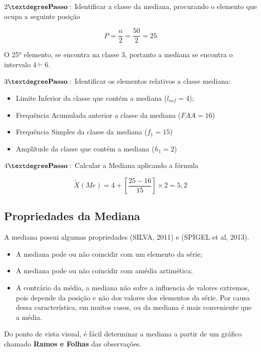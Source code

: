 $2° \mbox{\textbf{Passo}}:$ Identificar a classe da mediana, procurando o elemento que ocupa a seguinte posição

$$ P=\frac{n}{2}=\frac{50}{2}=25 $$

O 25° elemento, se encontra na classe 3, portanto a mediana se encontra o intervalo $ 4 \vdash 6$.

\vskip0.3cm

$3° \mbox{\textbf{Passo}}:$ Identificar os elementos relativos a classe mediana:

\begin{itemize}
  \item Limite Inferior da classe que contém a mediana ($l_{inf}=4$);
  \item Frequência Acumulada anterior a classe da mediana ($FAA=16$)
  \item Frequência Simples da classe da mediana ($f_{1}=15$)
  \item Amplitude da classe que contém a mediana ($h_{1}=2$)
\end{itemize}

$4° \mbox{\textbf{Passo}}:$ Calcular a Mediana aplicando a fórmula


\begin{equation}\label{}
    \tilde{X}(Me)= 4+\left[\frac{25-16}{15}\right]\times 2 = 5,2
\end{equation}






\newpage

\subsection{Propriedades da Mediana}

A mediana possui algumas propriedades (SILVA, 2011) e (SPIGEL et al, 2013).

\begin{itemize}
\item A mediana pode ou não coincidir com um elemento da série;
\item A mediana pode ou não coincidir com amédia artimética;
\item A contrário da média, a mediana não sofre a influencia de valores extremos, pois depende da posição e não dos valores dos elementos da série. Por causa dessa característica, em muitos casos, ou da mediana é mais conveniente que a média.    
\end{itemize}


Do ponto de vista visual, é fácil determinar a mediana a partir de um gráfico chamado \textbf{Ramos e Folhas} das observações.




